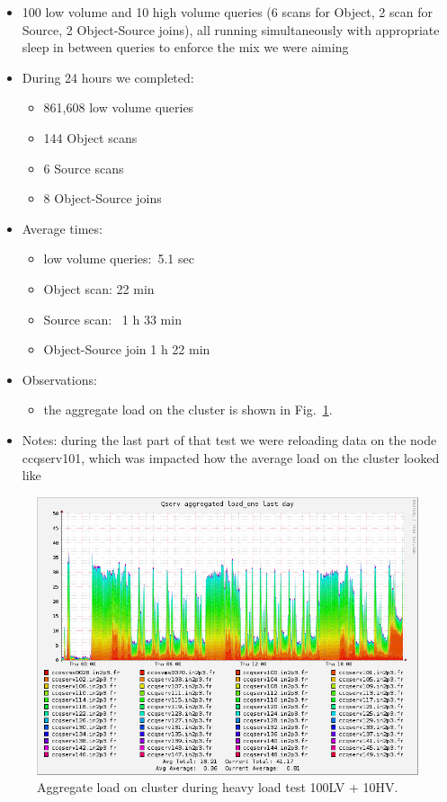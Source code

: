 \documentclass[DM,toc]{lsstdoc}
\begin{document}
\begin{itemize}
\item
  100 low volume and 10 high volume queries (6 scans for Object, 2 scan
  for Source, 2 Object-Source joins), all running simultaneously with
  appropriate sleep in between queries to enforce the mix we were aiming
\item
  During 24 hours we completed:

  \begin{itemize}
  \item
    861,608 low volume queries
  \item
    144 Object scans
  \item
    6 Source scans
  \item
    8 Object-Source joins
  \end{itemize}
\item
  Average times:

  \begin{itemize}
  \item
    low volume queries:~5.1 sec
  \item
    Object scan: 22 min
  \item
    Source scan: ~1 h 33 min
  \item
    Object-Source join 1 h 22 min
  \end{itemize}
\item
  Observations:

  \begin{itemize}
  \item
    the aggregate load on the
    cluster is shown in Fig.~\ref{fig:aggload10}.
  \end{itemize}
\item
  Notes: during the last part of that test we were reloading data on the
  node ccqserv101, which was impacted how the average load on the
  cluster looked like
\end{itemize}

\begin{figure}
\includegraphics[width=\textwidth]{in2p3_10HV100LV}
\caption{Aggregate load on cluster during heavy load test 100LV + 10HV.}
\label{fig:aggload10}
\end{figure}
\end{document}
